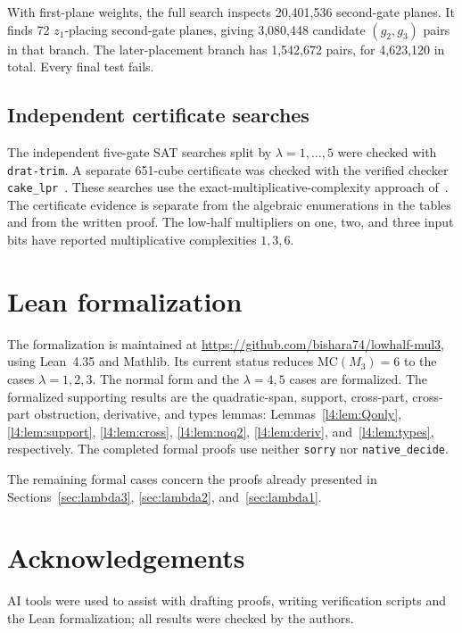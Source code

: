\documentclass[11pt,a4paper]{article}
\theoremstyle{plain}
\theoremstyle{remark}
\begin{document}
With first-plane weights, the full search inspects 20,401,536 second-gate planes. It finds 72 $z_1$-placing second-gate planes, giving 3,080,448 candidate $(g_2,g_3)$ pairs in that branch. The later-placement branch has 1,542,672 pairs, for 4,623,120 in total. Every final test fails.


\subsection{Independent certificate searches}
The independent five-gate SAT searches split by $\lambda=1,\ldots,5$ were checked with \texttt{drat-trim}. A separate 651-cube certificate was checked with the verified checker \texttt{cake\_lpr}~\cite{cert}. These searches use the exact-multiplicative-complexity approach of~\cite{soeken}. The certificate evidence is separate from the algebraic enumerations in the tables and from the written proof. The low-half multipliers on one, two, and three input bits have reported multiplicative complexities $1,3,6$.

\section{Lean formalization}\label{sec:lean}
The formalization is maintained at \url{https://github.com/bishara74/lowhalf-mul3}, using Lean~4.35 and Mathlib. Its current status reduces $\mathrm{MC}(M_3)=6$ to the cases $\lambda=1,2,3$. The normal form and the $\lambda=4,5$ cases are formalized. The formalized supporting results are the quadratic-span, support, cross-part, cross-part obstruction, derivative, and types lemmas: Lemmas~\ref{l4:lem:Qonly}, \ref{l4:lem:support}, \ref{l4:lem:cross}, \ref{l4:lem:noq2}, \ref{l4:lem:deriv}, and~\ref{l4:lem:types}, respectively. The completed formal proofs use neither \texttt{sorry} nor \texttt{native\_decide}.


The remaining formal cases concern the proofs already presented in Sections~\ref{sec:lambda3}, \ref{sec:lambda2}, and~\ref{sec:lambda1}.

\section*{Acknowledgements}
AI tools were used to assist with drafting proofs, writing verification scripts and the Lean formalization; all results were checked by the authors.
\end{document}
